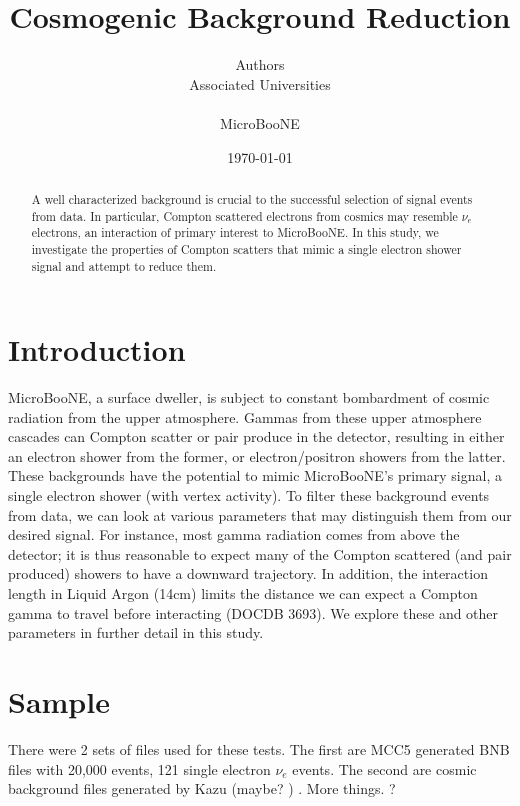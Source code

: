 \documentclass[10pt]{article}
\begin{document}
\title{ Cosmogenic Background Reduction }
\author{ Authors \\Associated Universities \\
\\MicroBooNE\\ }
\date{\today}
\maketitle

\renewcommand{\abstractname}{Abstract}
\begin{abstract}
A well characterized background is crucial to the successful selection of signal events from data.  In particular, Compton scattered electrons from cosmics may resemble $\nu_e$ electrons, an interaction of primary interest to MicroBooNE.  In this study, we investigate the properties of Compton scatters that mimic a single electron shower signal and attempt to reduce them. 

\end{abstract}

\tableofcontents
\setcounter{tocdepth}{1} 
\clearpage

\section{Introduction}
MicroBooNE, a surface dweller, is subject to constant bombardment of cosmic radiation from the upper atmosphere. Gammas from these upper atmosphere cascades can Compton scatter or pair produce in the detector, resulting in either an electron shower from the former, or electron/positron showers from the latter. These backgrounds have the potential to mimic MicroBooNE's primary signal, a single electron shower (with vertex activity).  To filter these background events from data, we can look at various parameters that may distinguish them from our desired signal. For instance, most gamma radiation comes from above the detector; it is thus reasonable to expect many of the Compton scattered (and pair produced) showers to have a downward trajectory. In addition, the interaction length in Liquid Argon (14cm) limits the distance we can expect a Compton gamma to travel before interacting (DOCDB 3693).   We explore these and other parameters in further detail in this study.

\section{Sample}
There were 2 sets of files used for these tests.  The first are MCC5 generated BNB files with 20,000 events, 121 single electron $\nu_e$ events. The second are cosmic background files generated by Kazu (maybe? ) . More things.  ?
\end{document}
